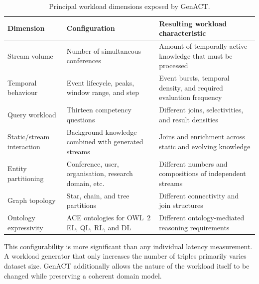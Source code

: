 \begin{table}[htbp]
    \centering
    \caption{Principal workload dimensions exposed by GenACT.}
    \label{tab:genact-workload-dimensions}
    \begin{tabular}{p{3.2cm}p{4.0cm}p{6.2cm}}
        \toprule
        \textbf{Dimension} &
        \textbf{Configuration} &
        \textbf{Resulting workload characteristic} \\
        \midrule

        Stream volume &
        Number of simultaneous conferences &
        Amount of temporally active knowledge that must be processed \\

        Temporal behaviour &
        Event lifecycle, peaks, window range, and step &
        Event bursts, temporal density, and required evaluation frequency \\

        Query workload &
        Thirteen competency questions &
        Different joins, selectivities, and result densities \\

        Static/stream interaction &
        Background knowledge combined with generated streams &
        Joins and enrichment across static and evolving knowledge \\

        Entity partitioning &
        Conference, user, organisation, research domain, etc. &
        Different numbers and compositions of independent streams \\

        Graph topology &
        Star, chain, and tree partitions &
        Different connectivity and join structures \\

        Ontology expressivity &
        ACE ontologies for OWL~2 EL, QL, RL, and DL &
        Different ontology-mediated reasoning requirements \\

        \bottomrule
    \end{tabular}
\end{table}

This configurability is more significant than any individual latency
measurement. A workload generator that only increases the number of triples
primarily varies dataset size. GenACT additionally allows the nature of the
workload itself to be changed while preserving a coherent domain model.

